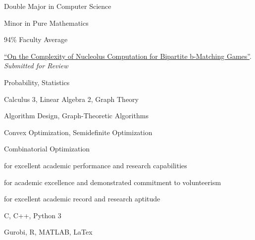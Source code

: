 \small
Double Major in Computer Science

\smallskip

Minor in Pure Mathematics

\smallskip

94\% Faculty Average

\small
\href{https://arxiv.org/abs/2105.07161}{``On the Complexity of Nucleolus Computation for Bipartite b-Matching Games''}.
\emph{Submitted for Review}

\small
Probability, Statistics

\smallskip

Calculus 3, Linear Algebra 2, Graph Theory

\divider\smallskip

Algorithm Design, Graph-Theoretic Algorithms

\smallskip

Convex Optimization, Semidefinite Optimization

\smallskip

Combinatorial Optimization

\small
{}\small
for excellent academic performance and research capabilities

\divider\smallskip

\small
for academic excellence and demonstrated commitment to volunteerism

\divider\smallskip

\small
for excellent academic record and research aptitude

\divider\smallskip




\small
C, C++, Python 3

\smallskip

Gurobi, R, MATLAB, LaTex
